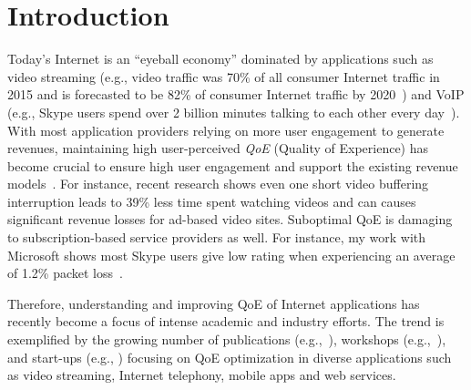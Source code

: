 \chapter{Introduction}


Today's Internet is an ``eyeball economy'' dominated by applications such 
as video streaming (e.g., video traffic was 70\% of all consumer Internet 
traffic in 2015 and is forecasted to be 82\% of consumer Internet traffic by 
2020~\cite{cisco-forecast-2015}) and VoIP (e.g., Skype users spend over 
2 billion minutes talking to each other every day~\cite{skype-2-billion-minutes}). 
With most application providers relying on more user engagement to generate 
revenues, maintaining high user-perceived {\em QoE} (Quality of Experience) 
has become crucial to ensure high user engagement and support the 
existing revenue models~\cite{sigcomm13athula}.
For instance, recent research shows even one short video buffering 
interruption leads to 39\% less time spent watching videos and can 
causes significant  revenue losses for ad-based video sites. 
Suboptimal QoE is damaging to subscription-based 
service providers as well. For instance, my work with Microsoft shows 
most Skype  users give low rating when experiencing an average of 
1.2\% packet loss~\cite{via}.

Therefore, understanding and improving QoE of Internet applications 
has recently become a focus of intense academic and industry efforts. 
The trend is exemplified by the growing number of 
publications (e.g.,~\cite{sigcomm13athula,sigcomm12,
wang2014speedy,sigcomm11,eona,krishnan2013video}), workshops 
(e.g.,~\cite{workshop-wmust,workshop-fhmn,workshop-qoe}), 
and start-ups (e.g., \cite{conviva,artizanetworks}) focusing on QoE optimization 
in diverse applications such as video streaming, Internet telephony, mobile 
apps and web services.



